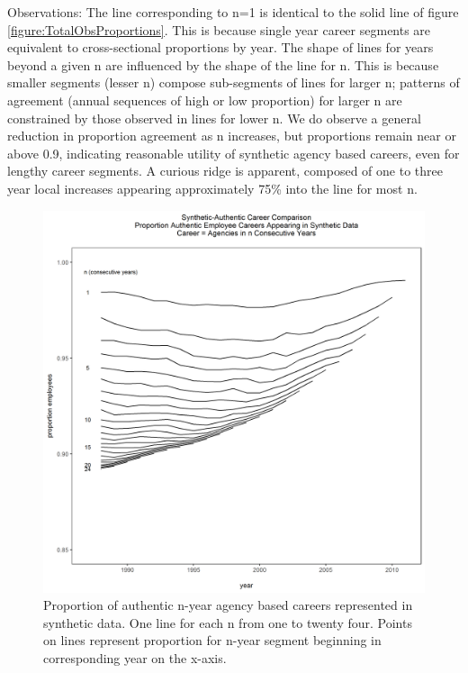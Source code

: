 \documentclass[10pt, letterpaper]{article}
\begin{document}
\begin{spacing}{1.0}
Observations:  The line corresponding to n=1 is identical to the solid line of figure \ref{figure:TotalObsProportions}.  This is because single year career segments are equivalent to cross-sectional proportions by year.  The shape of lines for years beyond a given n are influenced by the shape of the line for n.  This is because smaller segments (lesser n) compose sub-segments of lines for larger n; patterns of agreement (annual sequences of high or low proportion) for larger n are constrained by those observed in lines for lower n.  We do observe a general reduction in proportion agreement as n increases, but proportions remain near or above 0.9, indicating reasonable utility of synthetic agency based careers, even for lengthy career segments.  A curious ridge is apparent, composed of one to three year local increases appearing approximately 75\% into the line for most n.\\

\begin{figure}[h]
    \centering
    \includegraphics[width=5.25in, trim={0 0.25in 0 0.75in}, clip]{CareerProportionsAgency.png}
    \caption{Proportion of authentic n-year agency based careers represented in synthetic data.  One line for each n from one to twenty four.  Points on lines represent proportion for n-year segment beginning in corresponding year on the x-axis.}
    \label{figure:CareerProportionsAgency}
\end{figure}


\end{spacing}
\end{document}
